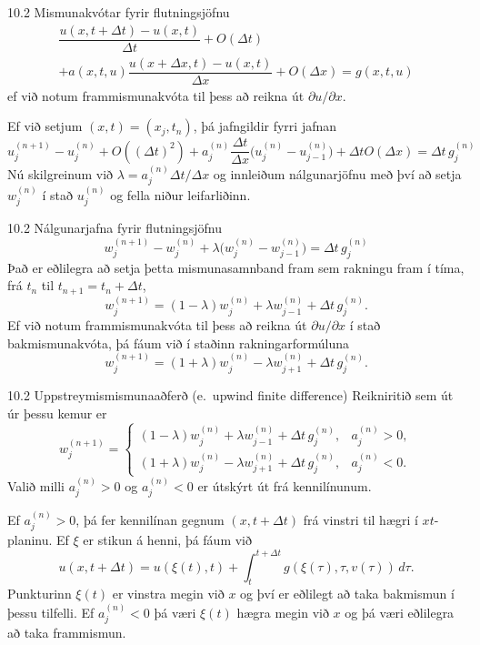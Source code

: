 \begin{frame}{10.2 Mismunakvótar fyrir flutningsjöfnu} 
\begin{multline*}
\dfrac{u(x,t+\Delta t)-u(x,t)}{\Delta t} +O(\Delta  t)\\
+a(x,t,u)\dfrac{u(x+\Delta x,t)-u(x,t)}{\Delta x}+O(\Delta x)
=g(x,t,u) 
\end{multline*}
ef við notum frammismunakvóta til þess að reikna út $\partial
u/\partial x$.

\smallskip
Ef við setjum $(x,t)=(x_j,t_n)$, þá jafngildir fyrri jafnan 
$$
u_j^{(n+1)}-u_j^{(n)}+O((\Delta t)^2)
+a_j^{(n)}\dfrac{\Delta t}{\Delta
  x}\big(u_j^{(n)}-u_{j-1}^{(n)}\big)+\Delta tO(\Delta x)=\Delta
t\, g_j^{(n)}
$$
Nú skilgreinum við $\lambda=a_j^{(n)}{\Delta t}/{\Delta x}$ og
innleiðum nálgunarjöfnu með því að setja $w_j^{(n)}$ í stað
$u_j^{(n)}$ og fella niður leifarliðinn.
\end{frame}


\begin{frame}{10.2 Nálgunarjafna fyrir flutningsjöfnu} 
$$
w_j^{(n+1)}-w_j^{(n)}
+\lambda \big(w_j^{(n)}-w_{j-1}^{(n)}\big)=\Delta t\, g_j^{(n)}
$$
Það er eðlilegra að setja þetta mismunasamnband fram sem 
rakningu fram í tíma, frá $t_n$ til $t_{n+1}=t_n+\Delta t$,
$$
w_j^{(n+1)}=(1-\lambda) w_j^{(n)}+\lambda w_{j-1}^{(n)}+\Delta
t\, g_j^{(n)}. 
$$
Ef við notum frammismunakvóta til þess að reikna út 
$\partial u/\partial x$ í stað bakmismunakvóta, þá fáum við í 
staðinn rakningarformúluna
$$
w_j^{(n+1)}=(1+\lambda) w_j^{(n)}-\lambda w_{j+1}^{(n)}+\Delta
t\, g_j^{(n)}. 
$$
\end{frame}


\begin{frame}{10.2 Uppstreymismismunaaðferð (e.~upwind finite difference)} 
Reikniritið sem út úr þessu kemur er
$$
w_j^{(n+1)}=
\begin{cases} 
(1-\lambda) w_j^{(n)}+\lambda w_{j-1}^{(n)}+\Delta
t\, g_j^{(n)},&a_j^{(n)}>0,\\
(1+\lambda) w_j^{(n)}-\lambda w_{j+1}^{(n)}+\Delta
t\, g_j^{(n)},&a_j^{(n)}<0.
\end{cases}
$$
\smallskip
Valið milli $a_j^{(n)}>0$ og  $a_j^{(n)}<0$ er útskýrt út frá
kennilínunum.  

\smallskip
Ef $a_j^{(n)}>0$, þá fer kennilínan gegnum $(x,t+\Delta t)$ 
frá vinstri til hægri í $xt$-planinu.  Ef $\xi$ er stikun á henni, þá
fáum við
$$
u(x,t+\Delta t)=u(\xi(t),t)+\int_t^{t+\Delta t}
g(\xi(\tau),\tau,v(\tau))\, d\tau.
$$
Punkturinn $\xi(t)$ er vinstra megin við $x$ og því er eðlilegt að
taka bakmismun í þessu tilfelli.  Ef $a_j^{(n)}<0$ þá væri $\xi(t)$
hægra megin við $x$ og þá væri eðlilegra að taka frammismun. 
\end{frame}


